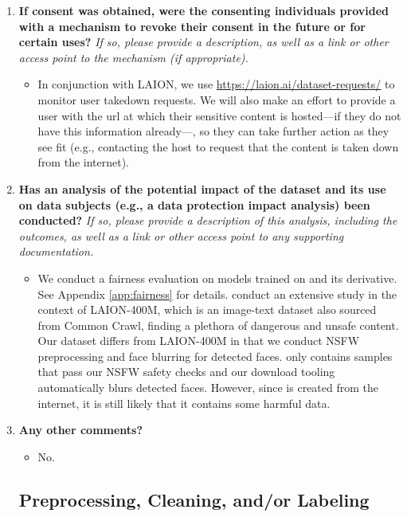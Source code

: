 \begin{enumerate}[label=Q\arabic*]
\item \textbf{If consent was obtained, were the consenting individuals provided with a mechanism to revoke their consent in the future or for certain uses?} \textit{If so, please provide a description, as well as a link or other access point to the mechanism (if appropriate).}

\begin{itemize}
\item In conjunction with LAION, we use \url{https://laion.ai/dataset-requests/} to monitor user takedown requests. We will also make an effort to provide a user with the url at which their sensitive content is hosted---if they do not have this information already---, so they can take further action as they see fit (e.g., contacting the host to request that the content is taken down from the internet).
\end{itemize}

\item \textbf{Has an analysis of the potential impact of the dataset and its use on data subjects (e.g., a data protection impact analysis) been conducted?} \textit{If so, please provide a description of this analysis, including the outcomes, as well as a link or other access point to any supporting documentation.}

\begin{itemize}
\item We conduct a fairness evaluation on models trained on \pool and its derivative. See Appendix \ref{app:fairness} for details. \citet{Birhane2021MultimodalDM} conduct an extensive study in the context of LAION-400M, which is an image-text dataset also sourced from Common Crawl, finding a plethora of dangerous and unsafe content. Our dataset differs from LAION-400M in that we conduct NSFW preprocessing and face blurring for detected faces. \pool only contains samples that pass our NSFW safety checks and our download tooling automatically blurs detected faces. However, since \pool is created from the internet, it is still likely that it contains some harmful data.
\end{itemize}

\item \textbf{Any other comments?}

\begin{itemize}
\item No.
\end{itemize}

\subsection{Preprocessing, Cleaning, and/or Labeling}


\end{enumerate}
